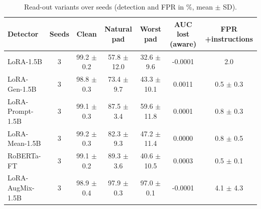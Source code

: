 \begin{table}[t]
\centering
\caption{Read-out variants over seeds (detection and FPR in \%, mean $\pm$ SD).}
\label{tab:roseeds}
\footnotesize
\begin{tabular}{lcccccc}
\toprule
\textbf{Detector} & \textbf{Seeds} & \textbf{Clean} & \textbf{Natural pad} & \textbf{Worst pad} & \textbf{AUC lost (aware)} & \textbf{FPR +instructions} \\
\midrule
LoRA-1.5B & 3 & 99.2 $\pm$ 0.2 & 57.8 $\pm$ 12.0 & 32.6 $\pm$ 9.6 & -0.0001 & 2.0 \\
LoRA-Gen-1.5B & 3 & 98.8 $\pm$ 0.3 & 73.4 $\pm$ 9.7 & 43.3 $\pm$ 10.1 & 0.0011 & 0.5 $\pm$ 0.3 \\
LoRA-Prompt-1.5B & 3 & 99.1 $\pm$ 0.3 & 87.5 $\pm$ 3.4 & 59.6 $\pm$ 11.8 & 0.0001 & 0.8 $\pm$ 0.3 \\
LoRA-Mean-1.5B & 3 & 99.2 $\pm$ 0.3 & 82.3 $\pm$ 9.3 & 47.2 $\pm$ 11.4 & 0.0000 & 0.8 $\pm$ 0.5 \\
RoBERTa-FT & 3 & 99.1 $\pm$ 0.2 & 89.3 $\pm$ 3.6 & 40.6 $\pm$ 10.5 & 0.0003 & 0.5 $\pm$ 0.1 \\
LoRA-AugMix-1.5B & 3 & 98.9 $\pm$ 0.4 & 97.9 $\pm$ 0.3 & 97.0 $\pm$ 0.1 & -0.0001 & 4.1 $\pm$ 4.3 \\
\bottomrule
\end{tabular}
\end{table}
